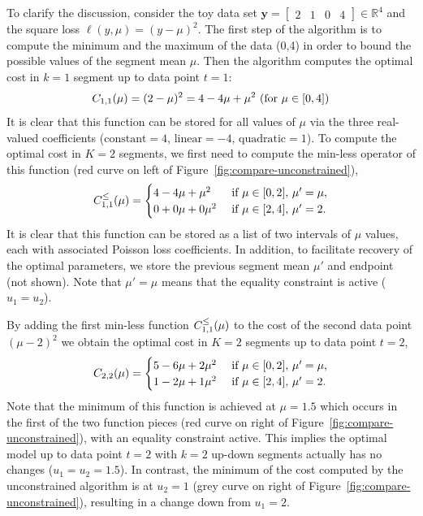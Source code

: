 \documentclass{article}
\newcommand{\RR}{\mathbb R}
\begin{document}
To clarify the discussion, consider the 
toy data set $\mathbf y= \left[
\begin{array}{cccccc}
  2 & 1 & 0 & 4
\end{array}
\right] \in\RR^4$ and the square loss $\ell(y,\mu)=(y-\mu)^2$. The first
step of the algorithm is to compute the minimum and the maximum of the
data (0,4) in order to bound the possible values of the segment
mean $\mu$. Then the algorithm computes the optimal cost in $k=1$ segment up
to data point $t=1$:
\begin{equation}
  C_{1,1}(\mu) = (2-\mu)^2=4 - 4\mu + \mu^2\text{ (for $\mu\in[0,4]$)}
\end{equation}
It is clear that this function can be stored for all values of $\mu$ via
the three real-valued coefficients ($\text{constant}=4$,
$\text{linear}=-4$, $\text{quadratic}=1$). To compute the optimal cost
in $K=2$ segments, we first need to compute the min-less operator of
this function (red curve on left of Figure~\ref{fig:compare-unconstrained}),
\begin{equation}
  C_{1,1}^\leq(\mu) =
  \begin{cases}
    4 - 4\mu + \mu^2 &\text{ if }\mu\in[0,2],\, \mu'=\mu,\\
    0 + 0\mu + 0\mu^2 & \text{ if }\mu\in[2,4],\,  \mu'=2.
  \end{cases}
\end{equation}
It is clear that this function can be stored as a list of two
intervals of $\mu$ values, each with associated Poisson loss
coefficients. In addition, to facilitate recovery of the optimal
parameters, we store the previous segment mean $\mu'$ and endpoint
(not shown). Note that $\mu'=\mu$ means that the equality constraint
is active ($u_1=u_2$).

By adding the first min-less function $C_{1,1}^\leq(\mu)$ to the
cost of the second data point $(\mu-2)^2$ we obtain the optimal cost in $K=2$
segments up to data point $t=2$,
\begin{equation}
  C_{2,2}(\mu) = 
  \begin{cases}
    5 - 6\mu + 2\mu^2 &\text{ if }\mu\in[0,2],\,  \mu'=\mu,\\
    1 - 2\mu + 1\mu^2 &\text{ if }\mu\in[2,4],\,  \mu'=2.
  \end{cases}
\end{equation}
Note that the minimum of this function is achieved at $\mu=1.5$ which
occurs in the first of the two function pieces (red curve on right of
Figure~\ref{fig:compare-unconstrained}), with an equality constraint
active. This implies the optimal model up to data point $t=2$ with
$k=2$ up-down segments actually has no changes ($u_1=u_2=1.5$). In
contrast, the minimum of the cost computed by the unconstrained
algorithm is at $u_2=1$ (grey curve on right of
Figure~\ref{fig:compare-unconstrained}), resulting in a change down
from $u_1=2$.
\end{document}
